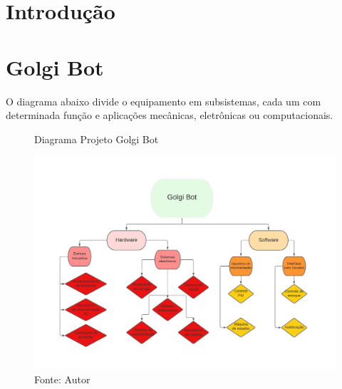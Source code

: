 \documentclass[]{politex}
\begin{document}

\listadefiguras

\sumario


\part{Introdução}





\part{Golgi Bot} 
O diagrama abaixo divide o equipamento em subsistemas, cada um com determinada função e aplicações mecânicas, eletrônicas ou computacionais.

\begin{figure}[h]
	\centering
		\caption{Diagrama Projeto Golgi Bot}
		\centering %
		\includegraphics[width=17cm]{docs/golgi_bot_general_diagram.pdf}
		\caption*{Fonte: Autor}
		\label{figura:Diagrama Projeto Golgi Bot}
	\end{figure}
	
\end{document}
